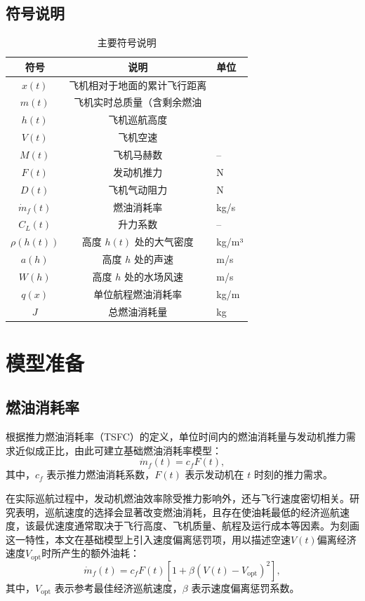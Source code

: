\documentclass[withoutpreface,bwprint]{cumcmthesis} %
\begin{document}
\subsection{符号说明}
\begin{table}[htbp]
\centering
\caption{主要符号说明}
\label{tab:symbols}
\begin{tabular}{ccl}
\toprule
符号 & 说明 & 单位 \\
\midrule
$x(t)$ & 飞机相对于地面的累计飞行距离& \\
$m(t)$ & 飞机实时总质量（含剩余燃油& \\
$h(t)$ & 飞机巡航高度& \\
$V(t)$ & 飞机空速& \\
$M(t)$  & 飞机马赫数& -- \\
$F(t)$ & 发动机推力 & N \\
$D(t)$  & 飞机气动阻力& N \\
$\dot m_f(t)$  & 燃油消耗率& kg/s \\
$C_L(t)$ & 升力系数& -- \\
$\rho(h(t))$ & 高度 $h(t)$ 处的大气密度& kg/m³ \\
$a(h)$& 高度 $h$ 处的声速& m/s \\
$W(h)$& 高度 $h$ 处的水场风速& m/s \\
$q(x)$ & 单位航程燃油消耗率& kg/m \\
$J$ & 总燃油消耗量& kg \\
\bottomrule
\end{tabular}
\end{table}
\section{模型准备}
\subsection{燃油消耗率}
根据推力燃油消耗率（TSFC）的定义，单位时间内的燃油消耗量与发动机推力需求近似成正比，由此可建立基础燃油消耗率模型：
\begin{equation}
    \dot{m}_f(t)=c_f F(t),
\end{equation}
其中，$c_f$ 表示推力燃油消耗系数，$F(t)$ 表示发动机在 $t$ 时刻的推力需求。

在实际巡航过程中，发动机燃油效率除受推力影响外，还与飞行速度密切相关。研究表明，巡航速度的选择会显著改变燃油消耗，且存在使油耗最低的经济巡航速度，该最优速度通常取决于飞行高度、飞机质量、航程及运行成本等因素\cite{1}。为刻画这一特性，本文在基础模型上引入速度偏离惩罚项，用以描述空速$V(t)$偏离经济速度$V_{\mathrm{opt}}$时所产生的额外油耗：
\begin{equation}
    \dot{m}_f(t)
    =
    c_f F(t)
    \left[
    1+\beta\left(V(t)-V_{\mathrm{opt}}\right)^2
    \right],
\end{equation}
其中，$V_{\mathrm{opt}}$ 表示参考最佳经济巡航速度，$\beta$ 表示速度偏离惩罚系数。
\end{document}
